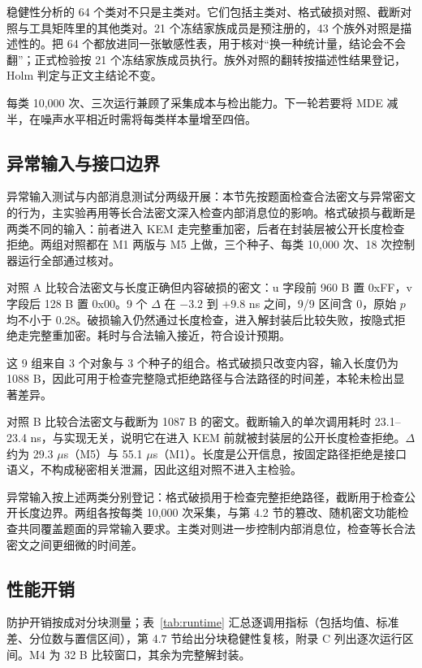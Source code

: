 稳健性分析的 64 个类对不只是主类对。它们包括主类对、格式破损对照、截断对照与工具矩阵里的其他类对。21 个冻结家族成员是预注册的，43 个族外对照是描述性的。把 64 个都放进同一张敏感性表，用于核对“换一种统计量，结论会不会翻”；正式检验按 21 个冻结家族成员执行。族外对照的翻转按描述性结果登记，Holm 判定与正文主结论不变。

每类 10,000 次、三次运行兼顾了采集成本与检出能力。下一轮若要将 MDE 减半，在噪声水平相近时需将每类样本量增至四倍。

\subsection{异常输入与接口边界}

异常输入测试与内部消息测试分两级开展：本节先按题面检查合法密文与异常密文的行为，主实验再用等长合法密文深入检查内部消息位的影响。格式破损与截断是两类不同的输入：前者进入 KEM 走完整重加密，后者在封装层被公开长度检查拒绝。两组对照都在 M1 两版与 M5 上做，三个种子、每类 10,000 次、18 次控制器运行全部通过核对。%

对照 A 比较合法密文与长度正确但内容破损的密文：u 字段前 960 B 置 0xFF，v 字段后 128 B 置 0x00。9 个 $\Delta$ 在 $-3.2$ 到 +9.8 ns 之间，9/9 区间含 0，原始 $p$ 均不小于 0.28。破损输入仍然通过长度检查，进入解封装后比较失败，按隐式拒绝走完整重加密。耗时与合法输入接近，符合设计预期。

这 9 组来自 3 个对象与 3 个种子的组合。格式破损只改变内容，输入长度仍为 1088 B，因此可用于检查完整隐式拒绝路径与合法路径的时间差，本轮未检出显著差异。

对照 B 比较合法密文与截断为 1087 B 的密文。截断输入的单次调用耗时 23.1--23.4 ns，与实现无关，说明它在进入 KEM 前就被封装层的公开长度检查拒绝。$\Delta$ 约为 29.3 $\mu$s（M5）与 55.1 $\mu$s（M1）。长度是公开信息，按固定路径拒绝是接口语义，不构成秘密相关泄漏，因此这组对照不进入主检验。

异常输入按上述两类分别登记：格式破损用于检查完整拒绝路径，截断用于检查公开长度边界。两组各按每类 10,000 次采集，与第 4.2 节的篡改、随机密文功能检查共同覆盖题面的异常输入要求。主类对则进一步控制内部消息位，检查等长合法密文之间更细微的时间差。

\subsection{性能开销}

防护开销按成对分块测量；表~\ref{tab:runtime} 汇总逐调用指标（包括均值、标准差、分位数与置信区间），第 4.7 节给出分块稳健性复核，附录 C 列出逐次运行区间。M4 为 32 B 比较窗口，其余为完整解封装。%

